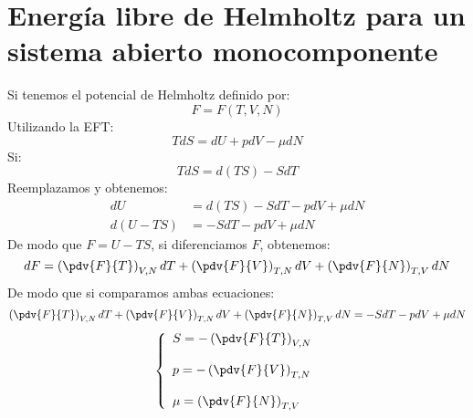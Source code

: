 \documentclass[../main]{subfiles}
\begin{document}
\section{Energía libre de Helmholtz para un sistema abierto monocomponente}
Si tenemos el potencial de Helmholtz definido por:
\begin{equation}
    F=F(T,V,N)
\end{equation}
Utilizando la EFT:
\begin{equation}
    TdS=dU+pdV-\mu dN
\end{equation}
Si:
\begin{equation*}
    TdS=d(TS)-SdT
\end{equation*}
Reemplazamos y obtenemos:
\begin{align}
    dU      & =d(TS)-SdT-pdV+\mu dN \\
    d(U-TS) & =-SdT-pdV+\mu dN
\end{align}
De modo que $F=U-TS$, si diferenciamos $F$, obtenemos:
\begin{equation}
    dF=\left( \pdv{F}{T}\right)_{V,N}dT+\left( \pdv{F}{V} \right)_{T,N}dV+\left( \pdv{F}{N}\right)_{T,V}dN
\end{equation}
De modo que si comparamos ambas ecuaciones:
\begin{equation}
    \left( \pdv{F}{T}\right)_{V,N}dT+\left( \pdv{F}{V} \right)_{T,N}dV+\left( \pdv{F}{N}\right)_{T,V}dN=-SdT-pdV+\mu dN
\end{equation}
\begin{equation}
    \left\{
    \begin{array}{l}
        S=\displaystyle -\left( \pdv{F}{T}\right)_{V,N}  \\ \\
        p=\displaystyle -\left( \pdv{F}{V} \right)_{T,N} \\ \\
        \mu=\displaystyle \left( \pdv{F}{N}\right)_{T,V}
    \end{array}
    \right.
\end{equation}
\end{document}
